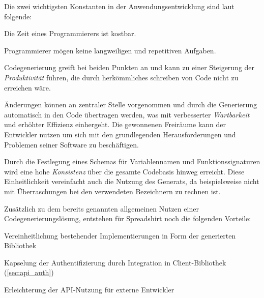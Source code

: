 
Die zwei wichtigsten Konstanten in der Anwendungsentwicklung sind laut \parencite{herrington2003code} folgende:
\begin{compactitem}
    \item Die Zeit eines Programmierers ist kostbar.
    \item Programmierer mögen keine langweiligen und repetitiven Aufgaben.
\end{compactitem}
Codegenerierung greift bei beiden Punkten an und kann zu einer Steigerung der \emph{Produktivität} führen, die durch herkömmliches schreiben von Code nicht zu erreichen wäre. 

Änderungen können an zentraler Stelle vorgenommen und durch die Generierung automatisch in den Code übertragen werden, was mit verbesserter \emph{Wartbarkeit} und erhöhter Effizienz einhergeht.
Die gewonnenen Freiräume kann der Entwickler nutzen um sich mit den grundlegenden Herausforderungen und Problemen seiner Software zu beschäftigen.

Durch die Festlegung eines Schemas für Variablennamen und Funktionssignaturen wird eine hohe \emph{Konsistenz} über die gesamte Codebasis hinweg erreicht.
Diese Einheitlichkeit vereinfacht auch die Nutzung des Generats, da beispielsweise nicht mit Überraschungen bei den verwendeten Bezeichnern zu rechnen ist.



Zusätzlich zu dem bereits genannten allgemeinen Nutzen einer Codegenerierungslösung, entstehen für Spreadshirt noch die folgenden Vorteile:
\begin{compactitem}
    \item Vereinheitlichung bestehender Implementierungen in Form der generierten Bibliothek
    \item Kapselung der Authentifizierung durch Integration in Client-Bibliothek (\cref{sec:api_auth})
    \item Erleichterung der \gls{API}-Nutzung für externe Entwickler
\end{compactitem}

